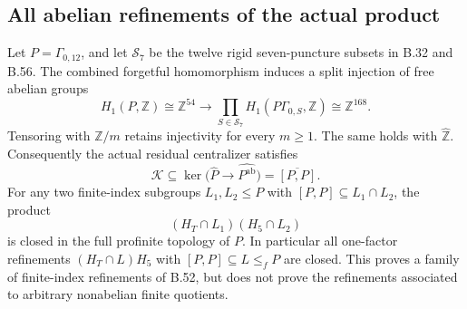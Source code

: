 \subsection*{All abelian refinements of the actual product}

Let $P=\Gamma_{0,12}$, and let $\mathscr S_7$ be the twelve
rigid seven-puncture subsets in B.32 and B.56.
The combined forgetful homomorphism induces a split injection
of free abelian groups
\[
 H_1(P,\mathbb Z)\cong\mathbb Z^{54}
 \longrightarrow
 \prod_{S\in\mathscr S_7}H_1(P\Gamma_{0,S},\mathbb Z)
 \cong\mathbb Z^{168}.                                      \tag{B.58.1}
\]
Tensoring with $\mathbb Z/m$ retains injectivity for every
$m\geq1$.  The same holds with $\widehat{\mathbb Z}$.
Consequently the actual residual centralizer satisfies
\[
 \mathcal K\subseteq
 \ker\bigl(\widehat P\longrightarrow
                    \widehat{P^{\mathrm{ab}}}\bigr)
 =\overline{[P,P]}.                                         \tag{B.58.2}
\]
For any two finite-index subgroups $L_1,L_2\leq P$ with
$[P,P]\subseteq L_1\cap L_2$, the product
\[
       (H_T\cap L_1)(H_5\cap L_2)                           \tag{B.58.3}
\]
is closed in the full profinite topology of $P$.
In particular all one-factor refinements
$(H_T\cap L)H_5$ with $[P,P]\subseteq L\leq_f P$ are closed.
This proves a family of finite-index refinements of B.52,
but does not prove the refinements associated to arbitrary
nonabelian finite quotients.

